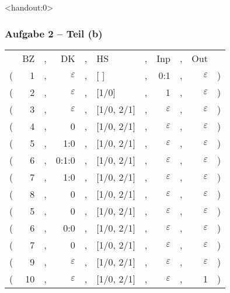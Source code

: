 \documentclass[aspectratio=1610,onlymath, ngerman]{beamer}
\renewcommand{\epsilon}{\varepsilon}
\begin{document}
	\begin{frame}<handout:0> \frametitle{Aufgabe 2 -- Teil (b)}
	\small
		\begin{center}
			\begin{tabular}{rrcrclcrcrl}
				& BZ &,& DK &,& HS &,& Inp &,& Out & \\
				( & 1 &,& $\epsilon$ &,& [ ] &,& 0:1 &,& $\epsilon$ & ) \\
				( & 2 &,& $\epsilon$ &,& [1/0] &,& 1 &,& $\epsilon$ & ) \\
				( & 3 &,& $\epsilon$ &,& [1/0, 2/1] &,& $\epsilon$ &,& $\epsilon$ & ) \\
				( & 4 &,& 0 &,& [1/0, 2/1] &,& $\epsilon$ &,& $\epsilon$ & ) \\
				( & 5 &,& 1:0 &,& [1/0, 2/1] &,& $\epsilon$ &,& $\epsilon$ & ) \\
				( & 6 &,& 0:1:0 &,& [1/0, 2/1] &,& $\epsilon$ &,& $\epsilon$ & ) \\
				( & 7 &,& 1:0 &,& [1/0, 2/1] &,& $\epsilon$ &,& $\epsilon$ & ) \\
				( & 8 &,& 0 &,& [1/0, 2/1] &,& $\epsilon$ &,& $\epsilon$ & ) \\
				( & 5 &,& 0 &,& [1/0, 2/1] &,& $\epsilon$ &,& $\epsilon$ & ) \\
				( & 6 &,& 0:0 &,& [1/0, 2/1] &,& $\epsilon$ &,& $\epsilon$ & ) \\
				( & 7 &,& 0 &,& [1/0, 2/1] &,& $\epsilon$ &,& $\epsilon$ & ) \\
				( & 9 &,& $\epsilon$ &,& [1/0, 2/1] &,& $\epsilon$ &,& $\epsilon$ & ) \\
				( & 10 &,& $\epsilon$ &,& [1/0, 2/1] &,& $\epsilon$ &,& 1 & ) \\
			\end{tabular}
		\end{center}
	\end{frame}
    
\end{document}
